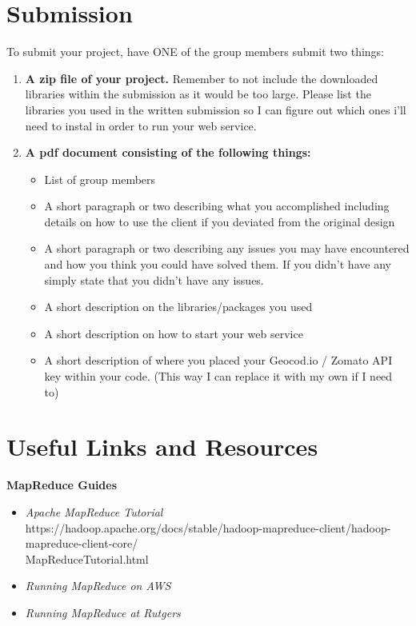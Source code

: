 \documentclass{article}
\begin{document}
\section*{Submission } 
To submit your project, have ONE of the group members submit two things:

\begin{enumerate}
\item \textbf{A zip file of your project.} Remember to not include the downloaded libraries within the submission as it would be too large. Please list the libraries you used in the written submission so I can figure out which ones i'll need to instal in order to run your web service.
\item \textbf{A pdf document consisting of the following things:}
	\begin{itemize}
	\item List of group members
	\item A short paragraph or two describing what you accomplished including details on how to use the client if you deviated from the original design
	\item A short paragraph or two describing any issues you may have encountered and how you think you could have solved them. If you didn't have any simply state that you didn't have any issues.
	\item A short description on the libraries/packages you used
	\item A short description on how to start your web service
	\item A short description of where you placed your Geocod.io / Zomato API key within your code. (This way I can replace it with my own if I need to)
	\end{itemize}
\end{enumerate}




\section*{Useful Links and Resources} %
\textbf{MapReduce Guides}
\begin{itemize}
    \item \textit{Apache MapReduce Tutorial}\\ https://hadoop.apache.org/docs/stable/hadoop-mapreduce-client/hadoop-mapreduce-client-core/\\MapReduceTutorial.html
    \item \textit{Running MapReduce on AWS}\\
    \item \textit{Running MapReduce at Rutgers}\\
\end{itemize}
\end{document}
